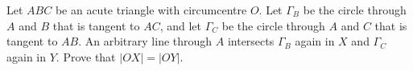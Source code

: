 Let $ABC$ be  an  acute  triangle  with  circumcentre $O$. Let $\mathit{\Gamma}_B$ be  the  circle through $A$ and $B$ that is tangent to $AC$,  and let $\mathit{\Gamma}_C$ be the circle through $A$ and $C$ that is tangent to $AB$.  An arbitrary line through $A$ intersects $\mathit{\Gamma}_B$ again in $X$ and $\mathit{\Gamma}_C$ again in $Y$. Prove that $|OX|=|OY|$.